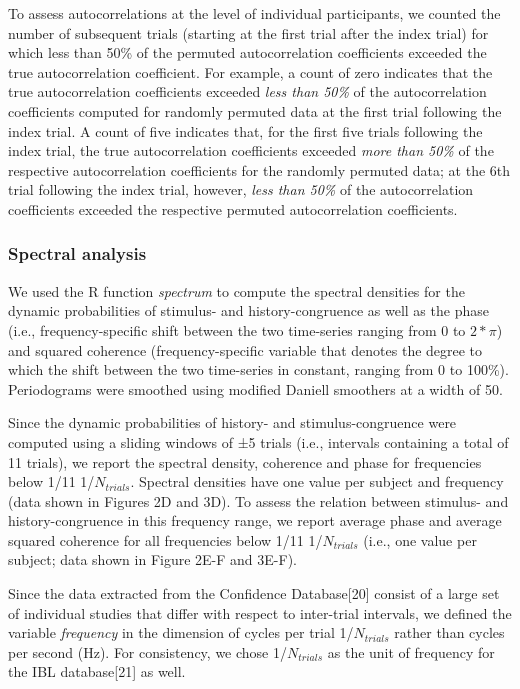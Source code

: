 \documentclass[
]{article}
\begin{document}
To assess autocorrelations at the level of individual participants, we
counted the number of subsequent trials (starting at the first trial
after the index trial) for which less than 50\% of the permuted
autocorrelation coefficients exceeded the true autocorrelation
coefficient. For example, a count of zero indicates that the true
autocorrelation coefficients exceeded \emph{less than 50\%} of the
autocorrelation coefficients computed for randomly permuted data at the
first trial following the index trial. A count of five indicates that,
for the first five trials following the index trial, the true
autocorrelation coefficients exceeded \emph{more than 50\%} of the
respective autocorrelation coefficients for the randomly permuted data;
at the 6th trial following the index trial, however, \emph{less than
50\%} of the autocorrelation coefficients exceeded the respective
permuted autocorrelation coefficients.

\hypertarget{spectral-analysis}{%
\subsubsection{Spectral analysis}\label{spectral-analysis}}

We used the R function \emph{spectrum} to compute the spectral densities
for the dynamic probabilities of stimulus- and history-congruence as
well as the phase (i.e., frequency-specific shift between the two
time-series ranging from 0 to \(2*\pi\)) and squared coherence
(frequency-specific variable that denotes the degree to which the shift
between the two time-series in constant, ranging from 0 to 100\%).
Periodograms were smoothed using modified Daniell smoothers at a width
of 50.

Since the dynamic probabilities of history- and stimulus-congruence were
computed using a sliding windows of ±5 trials (i.e., intervals
containing a total of 11 trials), we report the spectral density,
coherence and phase for frequencies below 1/11 1/\(N_{trials}\).
Spectral densities have one value per subject and frequency (data shown
in Figures 2D and 3D). To assess the relation between stimulus- and
history-congruence in this frequency range, we report average phase and
average squared coherence for all frequencies below 1/11
1/\(N_{trials}\) (i.e., one value per subject; data shown in Figure 2E-F
and 3E-F).

Since the data extracted from the Confidence Database{[}20{]} consist of
a large set of individual studies that differ with respect to
inter-trial intervals, we defined the variable \emph{frequency} in the
dimension of cycles per trial 1/\(N_{trials}\) rather than cycles per
second (Hz). For consistency, we chose 1/\(N_{trials}\) as the unit of
frequency for the IBL database{[}21{]} as well.
\end{document}
